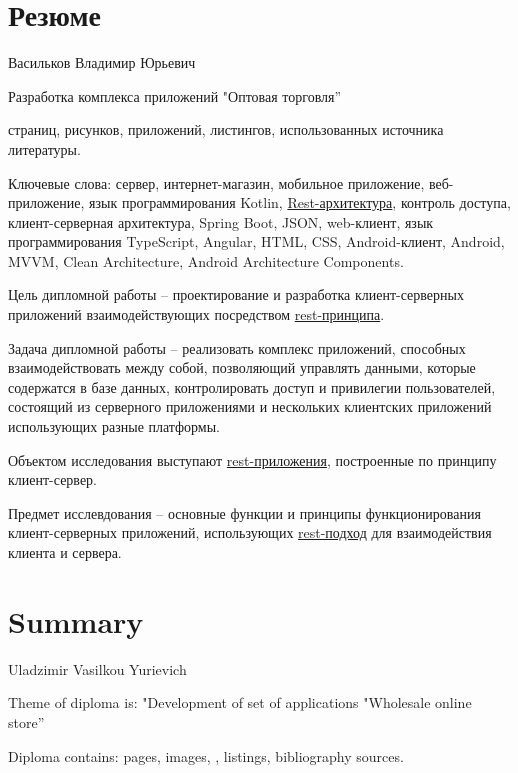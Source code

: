 \pagestyle{empty}
\section*{Резюме}\label{sec:cw-ru}\indent

Васильков Владимир Юрьевич

Разработка комплекса приложений "Оптовая торговля”

\pageref{LastPage} страниц,  рисунков,  приложений,  листингов,  использованных источника литературы.

Ключевые слова: сервер, интернет-магазин, мобильное приложение, веб-приложение, язык программирования Kotlin, \hyperlink{gloss:rest}{Rest-архитектура}, контроль доступа, клиент-серверная архитектура, Spring Boot, JSON, web-клиент, язык программирования TypeScript, Angular, HTML, CSS, Android-клиент, Android, MVVM, Clean Architecture, Android Architecture Components.

Цель дипломной работы – проектирование и разработка клиент-серверных приложений взаимодействующих посредством \hyperlink{gloss:rest}{rest-принципа}.

Задача дипломной работы – реализовать комплекс приложений, способных взаимодействовать между собой, позволяющий управлять данными, которые содержатся в базе данных, контролировать доступ и привилегии пользователей, состоящий из серверного приложениями и нескольких клиентских приложений использующих разные платформы.

Объектом исследования выступают \hyperlink{gloss:rest}{rest-приложения}, построенные по принципу клиент-сервер.

Предмет исслевдования – основные функции и принципы функционирования клиент-серверных приложений, использующих \hyperlink{gloss:rest}{rest-подход} для взаимодействия клиента и сервера.

\section*{Summary}\label{sec:cw-eng}\indent
{}

Uladzimir Vasilkou Yurievich

Theme of diploma is: "Development of set of applications "Wholesale online store”

Diploma contains: \pageref{LastPage} pages,  images, ,  listings,  bibliography sources.

